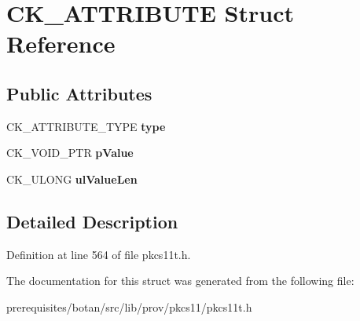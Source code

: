 \hypertarget{struct_c_k___a_t_t_r_i_b_u_t_e}{}\section{C\+K\+\_\+\+A\+T\+T\+R\+I\+B\+U\+TE Struct Reference}
\label{struct_c_k___a_t_t_r_i_b_u_t_e}
\subsection*{Public Attributes}
\begin{DoxyCompactItemize}
\item 
\mbox{\label{struct_c_k___a_t_t_r_i_b_u_t_e_a75f2e734f30124dfd27f53010affab07}} 
C\+K\+\_\+\+A\+T\+T\+R\+I\+B\+U\+T\+E\+\_\+\+T\+Y\+PE {\bfseries type}
\item 
\mbox{\label{struct_c_k___a_t_t_r_i_b_u_t_e_af96671d6383ed296ffcb7f7445790e6c}} 
C\+K\+\_\+\+V\+O\+I\+D\+\_\+\+P\+TR {\bfseries p\+Value}
\item 
\mbox{\label{struct_c_k___a_t_t_r_i_b_u_t_e_a645036d609793100f920d589b8d6d33b}} 
C\+K\+\_\+\+U\+L\+O\+NG {\bfseries ul\+Value\+Len}
\end{DoxyCompactItemize}


\subsection{Detailed Description}


Definition at line 564 of file pkcs11t.\+h.



The documentation for this struct was generated from the following file\+:\begin{DoxyCompactItemize}
\item 
prerequisites/botan/src/lib/prov/pkcs11/pkcs11t.\+h\end{DoxyCompactItemize}

